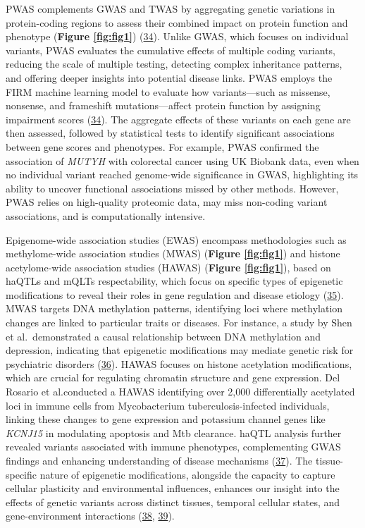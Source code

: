 PWAS complements GWAS and TWAS by aggregating genetic variations in protein-coding regions to assess their combined impact on protein function and phenotype (\textbf{Figure \ref{fig:fig1}}) (\protect\hyperlink{ref-1Dsj6bEd3}{34}).
Unlike GWAS, which focuses on individual variants, PWAS evaluates the cumulative effects of multiple coding variants, reducing the scale of multiple testing, detecting complex inheritance patterns, and offering deeper insights into potential disease links.
PWAS employs the FIRM machine learning model to evaluate how variants---such as missense, nonsense, and frameshift mutations---affect protein function by assigning impairment scores (\protect\hyperlink{ref-1Dsj6bEd3}{34}).
The aggregate effects of these variants on each gene are then assessed, followed by statistical tests to identify significant associations between gene scores and phenotypes.
For example, PWAS confirmed the association of \emph{MUTYH} with colorectal cancer using UK Biobank data, even when no individual variant reached genome-wide significance in GWAS, highlighting its ability to uncover functional associations missed by other methods.
However, PWAS relies on high-quality proteomic data, may miss non-coding variant associations, and is computationally intensive.

Epigenome-wide association studies (EWAS) encompass methodologies such as methylome-wide association studies (MWAS) (\textbf{Figure \ref{fig:fig1}}) and histone acetylome-wide association studies (HAWAS) (\textbf{Figure \ref{fig:fig1}}), based on haQTLs and mQLTs respectability, which focus on specific types of epigenetic modifications to reveal their roles in gene regulation and disease etiology (\protect\hyperlink{ref-TPqvAJda}{35}).
MWAS targets DNA methylation patterns, identifying loci where methylation changes are linked to particular traits or diseases.
For instance, a study by Shen et al.~demonstrated a causal relationship between DNA methylation and depression, indicating that epigenetic modifications may mediate genetic risk for psychiatric disorders (\protect\hyperlink{ref-1DNxNkLsT}{36}).
HAWAS focuses on histone acetylation modifications, which are crucial for regulating chromatin structure and gene expression.
Del Rosario et al.conducted a HAWAS identifying over 2,000 differentially acetylated loci in immune cells from Mycobacterium tuberculosis-infected individuals, linking these changes to gene expression and potassium channel genes like \emph{KCNJ15} in modulating apoptosis and Mtb clearance.
haQTL analysis further revealed variants associated with immune phenotypes, complementing GWAS findings and enhancing understanding of disease mechanisms (\protect\hyperlink{ref-1BYHeZlgB}{37}).
The tissue-specific nature of epigenetic modifications, alongside the capacity to capture cellular plasticity and environmental influences, enhances our insight into the effects of genetic variants across distinct tissues, temporal cellular states, and gene-environment interactions (\protect\hyperlink{ref-FeaSnwhX}{38}, \protect\hyperlink{ref-KfWCLspO}{39}).

